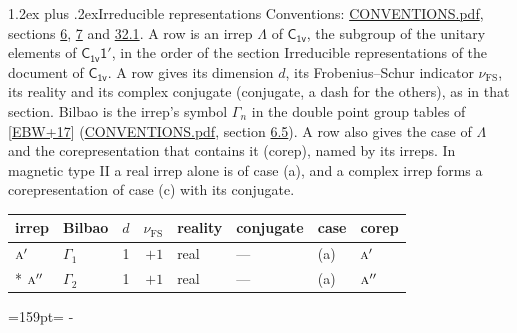 \documentclass[10pt,a4paper]{article}
\makeatletter
\renewcommand\section{\@startsection{section}{1}{\z@}{-3ex plus -1ex minus -.2ex}%
  {1.2ex plus .2ex}{\normalfont\large\sffamily\bfseries\color{parttitle}}}
\newcommand{\needspace}[1]{\par\penalty-100\begingroup\dimen0=#1\relax\dimen2=\pagegoal
  \advance\dimen2-\pagetotal\ifdim\dimen0>\dimen2\relax\ifdim\dimen2>0pt\vfil\break\fi\fi
  \endgroup}
\numberwithin{equation}{section}
\newcommand{\grp}[1]{\mathsf{#1}}
\newcommand{\irr}[1]{\text{\normalfont\scshape #1}}
\newcommand{\fsind}{\nu_{\mathrm{FS}}}
\makeatother
\begin{document}
\section{Irreducible representations}\label{s:irreps}
Conventions: \href{../../CONVENTIONS.pdf}{CONVENTIONS.pdf}, sections \href{../../../rotation/CONVENTIONS.pdf\#conv.6}{6}, \href{../../../rotation/CONVENTIONS.pdf\#conv.7}{7} and \href{../../CONVENTIONS.pdf\#conv.32.1}{32.1}.
\leavevmode\label{n:irrep.Delta}A row is an irrep $\Lambda$ of $\grp{C_{1v}}$, the subgroup of the unitary elements of $\grp{C_{1v}1'}$, in the order of the section Irreducible representations of the document of \href{../../../rotation/data/pdf/C1v.pdf}{$\grp{C_{1v}}$}. \label{n:index.dimension}\label{n:index.frobenius}\label{n:head.irrep}\label{n:head.reality}\label{n:head.conjugate}A row gives its dimension $d$, its Frobenius--Schur indicator $\fsind$, its reality and its complex conjugate (conjugate, a dash for the others), as in that section. \label{n:head.bilbao}\label{n:irrep.alias.gamma}Bilbao is the irrep's symbol $\Gamma_n$ in the double point group tables of [\href{../../../REFERENCES.pdf\#ref.EBW+17}{EBW+17}] (\href{../../CONVENTIONS.pdf}{CONVENTIONS.pdf}, section \href{../../../rotation/CONVENTIONS.pdf\#conv.6.5}{6.5}). \label{n:head.case.corep}\label{n:head.corep}A row also gives the case of $\Lambda$ and the corepresentation that contains it (corep), named by its irreps. In magnetic type II a real irrep alone is of case (a), and a complex irrep forms a corepresentation of case (c) with its conjugate.
\setlength{\emergencystretch}{2em}\par\setlength{\emergencystretch}{0pt}
{\small\renewcommand{\arraystretch}{1.25}\setlength{\tabcolsep}{4pt}\begin{longtable}{@{}llrrllll@{}}\toprule
irrep & Bilbao & $d$ & $\fsind$ & reality & conjugate & case & corep\\\midrule\endhead
\bottomrule\endfoot\endlastfoot
$\irr{a}'$ & $\Gamma_{1}$ & 1 & $+1$ & real & --- & (a) & $\irr{a}'$\\*
$\irr{a}''$ & $\Gamma_{2}$ & 1 & $+1$ & real & --- & (a) & $\irr{a}''$\\
\bottomrule\end{longtable}}
\needspace{159pt}
\end{document}
